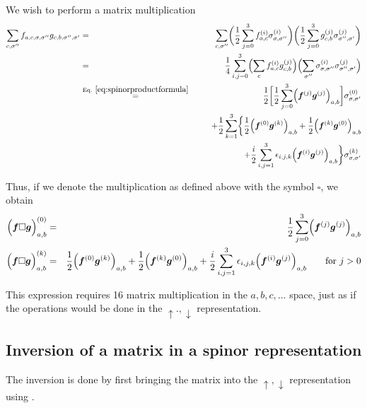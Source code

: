 \documentclass[11pt,a4paper]{report}
\begin{document}
We wish to perform a matrix multiplication
\begin{eqnarray*}
\sum_{c,\sigma''}
f_{a,c,\sigma,\sigma''}g_{c,b,\sigma'',\sigma'}
&=&
\sum_{c,\sigma''}
\biggl(\frac{1}{2}\sum_{j=0}^3
f^{(i)}_{a,c}\sigma^{(i)}_{\sigma,\sigma''}\biggr)
\biggl(\frac{1}{2}\sum_{j=0}^3
g^{(j)}_{c,b}\sigma^{(j)}_{\sigma'',\sigma'}\biggr)
\nonumber\\
&=&
\frac{1}{4}\sum_{i,j=0}^3
\Bigl(\sum_{c}
f^{(i)}_{a,c}g^{(j)}_{c,b}\Bigr)
\Bigl(\sum_{\sigma''}
\sigma^{(i)}_{\sigma,\sigma''}
\sigma^{(j)}_{\sigma'',\sigma'}\Bigr)
\nonumber\\
&\eqrel{eq:spinorproductformula}{=}&
\frac{1}{2}
\biggl[\frac{1}{2}\sum_{j=0}^3
\Bigl(\mat{f}^{(j)}\mat{g}^{(j)}\Bigr)_{a,b}\biggr]
\sigma^{(0)}_{\sigma,\sigma'}
\nonumber\\
&&+\frac{1}{2}\sum_{k=1}^3
\biggl\lbrace\frac{1}{2}\Bigl(\mat{f}^{(0)}\mat{g}^{(k)}\Bigr)_{a,b}
+\frac{1}{2}\Bigl(\mat{f}^{(k)}\mat{g}^{(0)}\Bigr)_{a,b}
\nonumber\\
&&\hspace{2cm}
+\frac{i}{2}\sum_{i,j=1}^3\epsilon_{i,j,k}\Bigl(\mat{f}^{(i)}\mat{g}^{(j)}\Bigr)_{a,b}
\biggr\rbrace
\sigma^{(k)}_{\sigma,\sigma'}
\end{eqnarray*}

Thus, if we denote the multiplication as defined above with the symbol
$\square$, we obtain
\begin{eqnarray}
\Bigl(\bm{f}\square\bm{g}\Bigr)^{(0)}_{a,b}
&=&\frac{1}{2}\sum_{j=0}^3\Bigl(\bm{f}^{(j)}\bm{g}^{(j)}\Bigr)_{a,b}
\\
\Bigl(\bm{f}\square\bm{g}\Bigr)^{(k)}_{a,b}
&=&\frac{1}{2}
\Bigl(\bm{f}^{(0)}\bm{g}^{(k)}\Bigr)_{a,b}
+\frac{1}{2}\Bigl(\bm{f}^{(k)}\bm{g}^{(0)}\Bigr)_{a,b}
+\frac{i}{2}\sum_{i,j=1}^3\epsilon_{i,j,k}
\Bigl(\bm{f}^{(i)}\bm{g}^{(j)}\Bigr)_{a,b}
\qquad\text{for $j>0$}
\end{eqnarray}

This expression requires 16 matrix multiplication in the
$a,b,c,\ldots$ space, just as if the operations would be done in the
$\uparrow.,\downarrow$ representation.

\subsection{Inversion of a matrix in a spinor representation}
The inversion is done by first bringing the matrix into the
$\uparrow,\downarrow$ representation
using .
\end{document}
